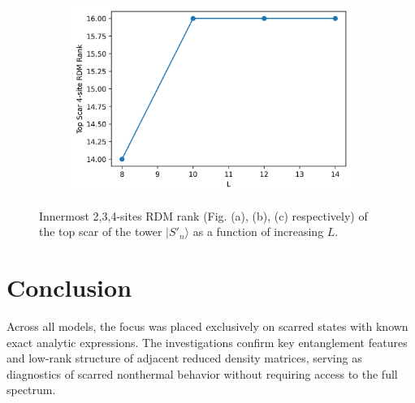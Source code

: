 \documentclass[11pt]{article}
\begin{document}
\begin{itemize}
\begin{itemize}
\begin{figure}[H]
\begin{subfigure}{0.45\textwidth}
        \includegraphics[width=\linewidth]{xy_scar_4p.png}
        \caption{}
        \label{fig:image3pxy}
    \end{subfigure}

    \caption{Innermost 2,3,4-sites RDM  rank (Fig. (a), (b), (c) respectively) of the top scar of the tower $|S'_n\rangle$ as a function of increasing $L$.}
    \label{fig:xy_scars_towerp}
\end{figure}

    \end{itemize}
\end{itemize}


\vspace{0.5cm}
\pagebreak
\section*{Conclusion}

Across all models, the focus was placed exclusively on scarred states with known exact analytic expressions. The investigations confirm key entanglement features and low-rank structure of adjacent reduced density matrices, serving as diagnostics of scarred nonthermal behavior without requiring access to the full spectrum.
\end{document}
